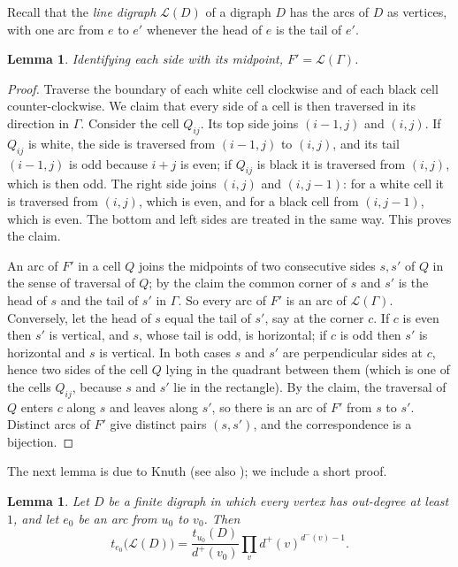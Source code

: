 \documentclass[11pt,a4paper]{amsart}
\newtheorem{lemma}[theorem]{Lemma}
\theoremstyle{remark}
\newcommand{\G}{\Gamma}
\newcommand{\dout}{d^{+}}
\newcommand{\din}{d^{-}}
\begin{document}
Recall that the \emph{line digraph} $\mathcal L(D)$ of a digraph $D$ has the arcs of $D$ as vertices, with one arc
from $e$ to $e'$ whenever the head of $e$ is the tail of $e'$.

\begin{lemma}\label{lem:line}
Identifying each side with its midpoint, $F'=\mathcal L(\G)$.
\end{lemma}

\begin{proof}
Traverse the boundary of each white cell clockwise and of each black cell counter-clockwise. We claim that every
side of a cell is then traversed in its direction in $\G$. Consider the cell $Q_{ij}$. Its top side joins
$(i-1,j)$ and $(i,j)$. If $Q_{ij}$ is white, the side is traversed from $(i-1,j)$ to $(i,j)$, and its tail
$(i-1,j)$ is odd because $i+j$ is even; if $Q_{ij}$ is black it is traversed from $(i,j)$, which is then odd.
The right side joins $(i,j)$ and $(i,j-1)$: for a white cell it is traversed from $(i,j)$, which is even, and for
a black cell from $(i,j-1)$, which is even. The bottom and left sides are treated in the same way. This proves the
claim.

An arc of $F'$ in a cell $Q$ joins the midpoints of two consecutive sides $s,s'$ of $Q$ in the sense of traversal
of $Q$; by the claim the common corner of $s$ and $s'$ is the head of $s$ and the tail of $s'$ in $\G$. So every
arc of $F'$ is an arc of $\mathcal L(\G)$. Conversely, let the head of $s$ equal the tail of $s'$, say at the
corner $c$. If $c$ is even then $s'$ is vertical, and $s$, whose tail is odd, is horizontal; if $c$ is odd then
$s'$ is horizontal and $s$ is vertical. In both cases $s$ and $s'$ are perpendicular sides at $c$, hence two sides
of the cell $Q$ lying in the quadrant between them (which is one of the cells $Q_{ij}$, because $s$ and $s'$ lie in
the rectangle). By the claim, the traversal of $Q$ enters $c$ along $s$ and leaves along $s'$, so there is an arc of
$F'$ from $s$ to $s'$. Distinct arcs of $F'$ give distinct pairs $(s,s')$, and the correspondence is a bijection.
\end{proof}

The next lemma is due to Knuth \cite{Knuth} (see also \cite{Levine}); we include a short proof.

\begin{lemma}\label{lem:knuth}
Let $D$ be a finite digraph in which every vertex has out-degree at least $1$, and let $e_0$ be an arc from $u_0$ to
$v_0$. Then
\[ t_{e_0}\bigl(\mathcal L(D)\bigr)=\frac{t_{u_0}(D)}{\dout(v_0)}\prod_{v}\dout(v)^{\din(v)-1}. \]
\end{lemma}
\end{document}
